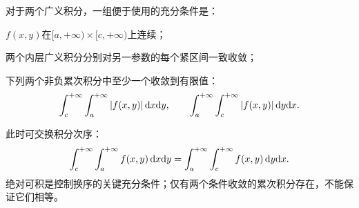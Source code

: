 对于两个广义积分，一组便于使用的充分条件是：
\begin{compactenum}
    \item $f(x,y)$在$[a,+\infty) \times [c,+\infty)$上连续；
    \item 两个内层广义积分分别对另一参数的每个紧区间一致收敛；
    \item 下列两个非负累次积分中至少一个收敛到有限值：
    \[
        \int_c^{+\infty}\int_a^{+\infty}|f(x,y)|\mathop{}\!\mathrm{d} x\mathrm{d} y,\qquad
        \int_a^{+\infty}\int_c^{+\infty}|f(x,y)|\mathop{}\!\mathrm{d} y\mathrm{d} x.
    \]
\end{compactenum}
此时可交换积分次序：
\begin{equation}\label{eq:calc-fubini-improper}
    \int_c^{+\infty}\int_a^{+\infty}f(x,y)\mathop{}\!\mathrm{d} x\mathrm{d} y
    = \int_a^{+\infty}\int_c^{+\infty}f(x,y)\mathop{}\!\mathrm{d} y\mathrm{d} x.
\end{equation}
绝对可积是控制换序的关键充分条件；仅有两个条件收敛的累次积分存在，不能保证它们相等。

